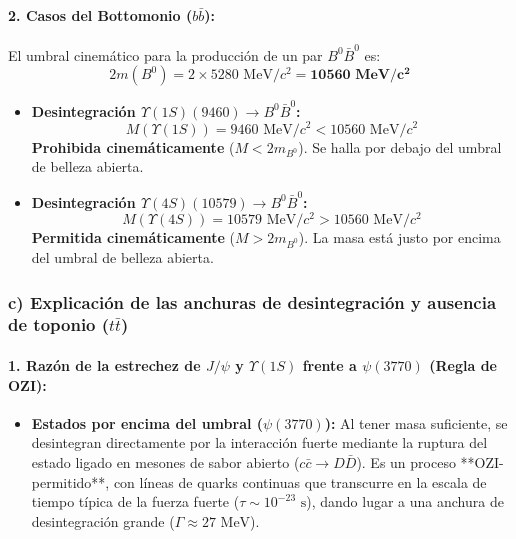 \begin{problema}
\paragraph{2. Casos del Bottomonio ($b\bar{b}$):}
El umbral cinemático para la producción de un par $B^0 \bar{B}^0$ es:
\begin{equation*}
2 m(B^0) = 2 \times 5280\text{ MeV}/c^2 = \mathbf{10560\text{ MeV}/c^2}
\end{equation*}

\begin{itemize}
    \item \textbf{Desintegración $\Upsilon(1S)(9460) \to B^0 \bar{B}^0$:}
    \begin{equation*}
    M(\Upsilon(1S)) = 9460\text{ MeV}/c^2 < 10560\text{ MeV}/c^2
    \end{equation*}
    \textbf{Prohibida cinemáticamente} ($M < 2 m_{B^0}$). Se halla por debajo del umbral de belleza abierta.

    \item \textbf{Desintegración $\Upsilon(4S)(10579) \to B^0 \bar{B}^0$:}
    \begin{equation*}
    M(\Upsilon(4S)) = 10579\text{ MeV}/c^2 > 10560\text{ MeV}/c^2
    \end{equation*}
    \textbf{Permitida cinemáticamente} ($M > 2 m_{B^0}$). La masa está justo por encima del umbral de belleza abierta.
\end{itemize}

\subsubsection*{c) Explicación de las anchuras de desintegración y ausencia de toponio ($t\bar{t}$)}

\paragraph{1. Razón de la estrechez de $J/\psi$ y $\Upsilon(1S)$ frente a $\psi(3770)$ (Regla de OZI):}
\begin{itemize}
    \item \textbf{Estados por encima del umbral ($\psi(3770)$):} Al tener masa suficiente, se desintegran directamente por la interacción fuerte mediante la ruptura del estado ligado en mesones de sabor abierto ($c\bar{c} \to D\bar{D}$). Es un proceso **OZI-permitido**, con líneas de quarks continuas que transcurre en la escala de tiempo típica de la fuerza fuerte ($\tau \sim 10^{-23}\text{ s}$), dando lugar a una anchura de desintegración grande ($\Gamma \approx 27\text{ MeV}$).
    

\end{itemize}
\end{problema}
